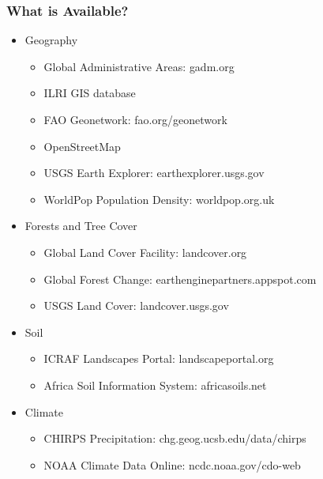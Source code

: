 \documentclass{beamer}
\begin{document}
\begin{frame}
\frametitle{What is Available?}

\begin{itemize}
	\item Geography
	\begin{itemize}
		\item Global Administrative Areas: gadm.org
		\item ILRI GIS database
		\item FAO Geonetwork: fao.org/geonetwork
		\item OpenStreetMap
		\item USGS Earth Explorer: earthexplorer.usgs.gov
		\item WorldPop Population Density: worldpop.org.uk
	\end{itemize}
	\item Forests and Tree Cover
	\begin{itemize}
		\item Global Land Cover Facility: landcover.org
		\item Global Forest Change: earthenginepartners.appspot.com
		\item USGS Land Cover: landcover.usgs.gov
	\end{itemize}
	\item Soil 
	\begin{itemize}
		\item ICRAF Landscapes Portal: landscapeportal.org
		\item Africa Soil Information System: africasoils.net
	\end{itemize}
	\item Climate
	\begin{itemize}
		\item CHIRPS Precipitation: chg.geog.ucsb.edu/data/chirps
		\item NOAA Climate Data Online: ncdc.noaa.gov/cdo-web
	\end{itemize}
\end{itemize}
	
\end{frame}
\end{document}
